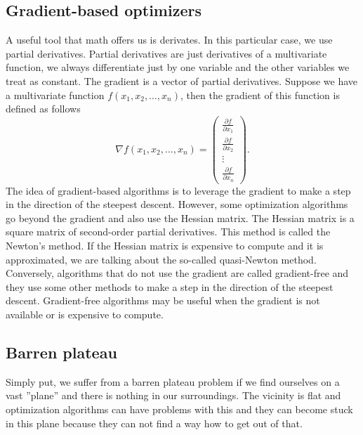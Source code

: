 \subsection{Gradient-based optimizers}
A useful tool that math offers us is derivates. In this particular case, we use partial derivatives. Partial derivatives are just derivatives of a multivariate function, we always differentiate just by one variable and the other variables we treat as constant. The gradient is a vector of partial derivatives. Suppose we have a multivariate function $f(x_1, x_2, \ldots, x_n)$, then the gradient of this function is defined as follows
$$\nabla f(x_1, x_2, \ldots, x_n) =  \begin{pmatrix} \frac{\partial f}{\partial x_1} \\ \frac{\partial f}{\partial x_2} \\ \vdots \\ \frac{\partial f}{\partial x_n}\end{pmatrix} \text{.}$$
The idea of gradient-based algorithms is to leverage the gradient to make a step in the direction of the steepest descent. However, some optimization algorithms go beyond the gradient and also use the Hessian matrix. The Hessian matrix is a square matrix of second-order partial derivatives. This method is called the Newton's method. If the Hessian matrix is expensive to compute and it is approximated, we are talking about the so-called quasi-Newton method. Conversely, algorithms that do not use the gradient are called gradient-free and they use some other methods to make a step in the direction of the steepest descent. Gradient-free algorithms may be useful when the gradient is not available or is expensive to compute.


\subsection{Barren plateau}


Simply put, we suffer from a barren plateau problem if we find ourselves on a vast ''plane'' and there is nothing in our surroundings. The vicinity is flat and optimization algorithms can have problems with this and they can become stuck in this plane because they can not find a way how to get out of that. 

